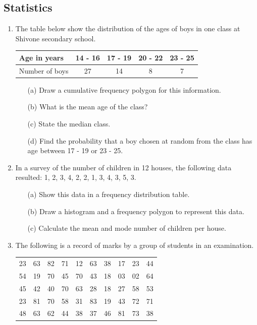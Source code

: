 	\subsection{Statistics} \label{f3stats}
\begin{enumerate}

	\item The table below show the distribution of the ages of boys in one class at Shivone secondary school.\\
	\begin{tabular}{|l|c|c|c|c|} \hline
	Age in years & 14 - 16&17 - 19&20 - 22&23 - 25\\ \hline
	Number of boys&27&14&8&7\\ \hline	
	\end{tabular}
		\begin{itemize}
		\item[(a)] Draw a cumulative frequency polygon for this information.
		\item[(b)] What is the mean age of the class?
		\item[(c)] State the median class.
		\item[(d)] Find the probability that a boy chosen at random from the class has age between 17 - 19 or 23 - 25.
		\end{itemize}

	\item In a survey of the number of children in 12 houses, the following data resulted: 1, 2, 3, 4, 2, 2, 1, 3, 4, 3, 5, 3.
		\begin{itemize}
		\item[(a)] Show this data in a frequency distribution table.
		\item[(b)] Draw a histogram and a frequency polygon to represent this data.
		\item[(c)] Calculate the mean and mode number of children per house.
		\end{itemize}

	\item The following is a record of marks by a group of students in an examination.\\
	
	\begin{tabular}{cccccccccc}
	23&63&82&71&12&63&38&17&23&44 \\
	54&19&70&45&70&43&18&03&02&64 \\
	45&42&40&70&63&28&18&27&58&53 \\
	23&81&70&58&31&83&19&43&72&71 \\
	48&63&62&44&38&37&46&81&73&38 	
	\end{tabular}
	

\end{enumerate}
